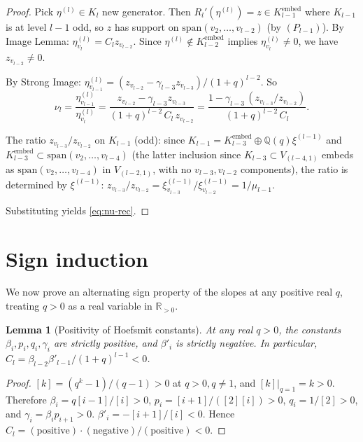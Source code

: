 \documentclass[11pt]{article}
\newtheorem{lemma}[theorem]{Lemma}
\theoremstyle{definition}
\begin{document}
\begin{proof}
Pick $\eta^{(l)} \in K_l$ new generator.  Then $R_l'(\eta^{(l)}) =
z \in K_{l-1}^{\mathrm{embed}}$ where $K_{l-1}$ is at level $l-1$
odd, so $z$ has support on $\mathrm{span}(v_2,\ldots,v_{l-2})$ (by
$(P_{l-1})$).  By Image Lemma: $\eta^{(l)}_{v_l} = C_l z_{v_{l-2}}$.
Since $\eta^{(l)} \notin K_{l-2}^{\mathrm{embed}}$ implies
$\eta^{(l)}_{v_l} \neq 0$, we have $z_{v_{l-2}} \neq 0$.

By Strong Image:
$\eta^{(l)}_{v_{l-1}} = (z_{v_{l-2}} - \gamma_{l-3} z_{v_{l-3}})/(1+q)^{l-2}$.
So
\[
\nu_l = \frac{\eta^{(l)}_{v_{l-1}}}{\eta^{(l)}_{v_l}}
      = \frac{z_{v_{l-2}} - \gamma_{l-3} z_{v_{l-3}}}{(1+q)^{l-2}\, C_l\, z_{v_{l-2}}}
      = \frac{1 - \gamma_{l-3}\,(z_{v_{l-3}}/z_{v_{l-2}})}{(1+q)^{l-2}\, C_l}.
\]

The ratio $z_{v_{l-3}}/z_{v_{l-2}}$ on $K_{l-1}$ (odd): since
$K_{l-1} = K_{l-3}^{\mathrm{embed}} \oplus \mathbb{Q}(q)\xi^{(l-1)}$
and $K_{l-3}^{\mathrm{embed}} \subset \mathrm{span}(v_2,\ldots,v_{l-4})$
(the latter inclusion since $K_{l-3} \subset V_{(l-4,1)}$ embeds as
$\mathrm{span}(v_2,\ldots,v_{l-4})$ in $V_{(l-2,1)}$, with no
$v_{l-3}, v_{l-2}$ components), the ratio is determined by $\xi^{(l-1)}$:
$z_{v_{l-3}}/z_{v_{l-2}} = \xi^{(l-1)}_{v_{l-3}}/\xi^{(l-1)}_{v_{l-2}} = 1/\mu_{l-1}$.

Substituting yields \eqref{eq:nu-rec}.
\end{proof}

\section{Sign induction}\label{sec:signs}

We now prove an alternating sign property of the slopes at any
positive real $q$, treating $q > 0$ as a real variable in $\mathbb{R}_{>0}$.

\begin{lemma}[Positivity of Hoefsmit constants]\label{lem:positivity}
At any real $q > 0$, the constants $\beta_i, p_i, q_i, \gamma_i$
are strictly positive, and $\beta'_i$ is strictly negative.  In
particular, $C_l = \beta_{l-2} \beta'_{l-1}/(1+q)^{l-1} < 0$.
\end{lemma}

\begin{proof}
$[k] = (q^k-1)/(q-1) > 0$ at $q > 0, q \neq 1$, and $[k]|_{q=1} = k > 0$.
Therefore $\beta_i = q[i-1]/[i] > 0$, $p_i = [i+1]/([2][i]) > 0$,
$q_i = 1/[2] > 0$, and $\gamma_i = \beta_i p_{i+1} > 0$.
$\beta'_i = -[i+1]/[i] < 0$.  Hence $C_l = (\text{positive})\cdot(\text{negative})/(\text{positive}) < 0$.
\end{proof}
\end{document}
